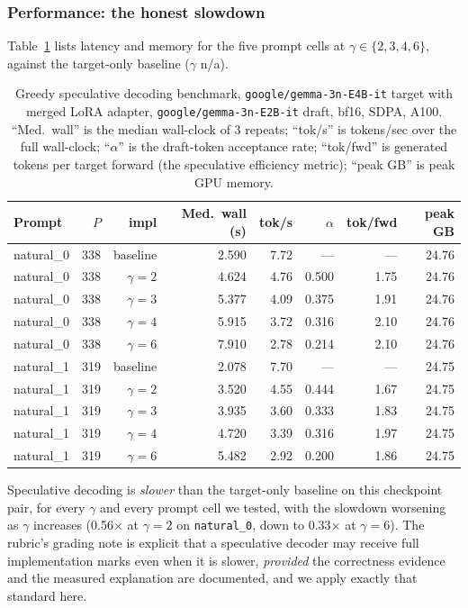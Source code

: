 \documentclass[conference]{IEEEtran}
\newcommand{\code}[1]{\texttt{\small #1}}
\newcommand{\modelname}{\texttt{google/gemma-3n-E4B-it}}
\newcommand{\draftname}{\texttt{google/gemma-3n-E2B-it}}
\begin{document}
\subsubsection{Performance: the honest slowdown}
\label{sec:specperf}

Table~\ref{tab:spec} lists latency and memory for the five
prompt cells at $\gamma \in \{2,3,4,6\}$, against the
target-only baseline ($\gamma$ n/a).

\begin{table}[t]
\caption{Greedy speculative decoding benchmark,
\modelname{} target with merged LoRA adapter,
\draftname{} draft, bf16, SDPA, A100. ``Med.\
wall'' is the median wall-clock of 3 repeats; ``tok/s'' is
tokens/sec over the full wall-clock; ``$\alpha$'' is the
draft-token acceptance rate; ``tok/fwd'' is generated tokens per
target forward (the speculative efficiency metric); ``peak GB''
is peak GPU memory.}
\label{tab:spec}
\centering
\scriptsize
\setlength{\tabcolsep}{3.0pt}
\begin{tabular}{lrrrrrrr}
\toprule
\textbf{Prompt} & \textbf{$P$} & \textbf{impl} &
\textbf{Med.\ wall (s)} & \textbf{tok/s} & $\alpha$ &
\textbf{tok/fwd} & \textbf{peak GB}\\
\midrule
natural\_0 & 338 & baseline & 2.590 & 7.72 & --- & --- & 24.76\\
natural\_0 & 338 & $\gamma{=}2$ & 4.624 & 4.76 & 0.500 & 1.75 & 24.76\\
natural\_0 & 338 & $\gamma{=}3$ & 5.377 & 4.09 & 0.375 & 1.91 & 24.76\\
natural\_0 & 338 & $\gamma{=}4$ & 5.915 & 3.72 & 0.316 & 2.10 & 24.76\\
natural\_0 & 338 & $\gamma{=}6$ & 7.910 & 2.78 & 0.214 & 2.10 & 24.76\\
\midrule
natural\_1 & 319 & baseline & 2.078 & 7.70 & --- & --- & 24.75\\
natural\_1 & 319 & $\gamma{=}2$ & 3.520 & 4.55 & 0.444 & 1.67 & 24.75\\
natural\_1 & 319 & $\gamma{=}3$ & 3.935 & 3.60 & 0.333 & 1.83 & 24.75\\
natural\_1 & 319 & $\gamma{=}4$ & 4.720 & 3.39 & 0.316 & 1.97 & 24.75\\
natural\_1 & 319 & $\gamma{=}6$ & 5.482 & 2.92 & 0.200 & 1.86 & 24.75\\
\bottomrule
\end{tabular}
\end{table}

Speculative decoding is \emph{slower} than the target-only
baseline on this checkpoint pair, for every $\gamma$ and every
prompt cell we tested, with the slowdown worsening as
$\gamma$ increases (0.56$\times$ at $\gamma{=}2$ on
\code{natural\_0}, down to 0.33$\times$ at $\gamma{=}6$).
The rubric's grading note is explicit that a speculative decoder
may receive full implementation marks even when it is slower,
\emph{provided} the correctness evidence and the measured
explanation are documented, and we apply exactly that standard here.
\end{document}
